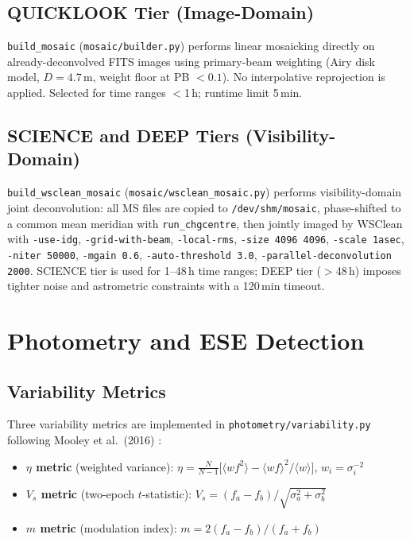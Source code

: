 \documentclass[12pt,a4paper]{article}
\begin{document}
\subsection{QUICKLOOK Tier (Image-Domain)}

\texttt{build\_mosaic} (\texttt{mosaic/builder.py}) performs linear
mosaicking directly on already-deconvolved FITS images using primary-beam
weighting (Airy disk model, $D=4.7$\,m, weight floor at PB $< 0.1$).
No interpolative reprojection is applied.  Selected for time ranges $<$1\,h;
runtime limit 5\,min.

\subsection{SCIENCE and DEEP Tiers (Visibility-Domain)}

\texttt{build\_wsclean\_mosaic} (\texttt{mosaic/wsclean\_mosaic.py}) performs
visibility-domain joint deconvolution: all MS files are copied to
\texttt{/dev/shm/mosaic}, phase-shifted to a common mean meridian with
\texttt{run\_chgcentre}, then jointly imaged by WSClean with
\texttt{-use-idg}, \texttt{-grid-with-beam}, \texttt{-local-rms},
\texttt{-size 4096 4096}, \texttt{-scale 1asec}, \texttt{-niter 50000},
\texttt{-mgain 0.6}, \texttt{-auto-threshold 3.0},
\texttt{-parallel-deconvolution 2000}.
SCIENCE tier is used for 1--48\,h time ranges; DEEP tier ($>$48\,h) imposes
tighter noise and astrometric constraints with a 120\,min timeout.

\section{Photometry and ESE Detection}

\subsection{Variability Metrics}

Three variability metrics are implemented in
\texttt{photometry/variability.py} following Mooley et al.\ (2016) \cite{mooley2016}:

\begin{itemize}[leftmargin=2em]
  \item \textbf{$\eta$ metric} (weighted variance):
    $\eta = \frac{N}{N-1}
      \bigl[\langle w f^2\rangle - \langle wf\rangle^2/\langle w\rangle\bigr]$,
    $w_i = \sigma_i^{-2}$
  \item \textbf{$V_s$ metric} (two-epoch $t$-statistic):
    $V_s = (f_a - f_b)/\sqrt{\sigma_a^2 + \sigma_b^2}$
  \item \textbf{$m$ metric} (modulation index):
    $m = 2(f_a - f_b)/(f_a + f_b)$
\end{itemize}
\end{document}
